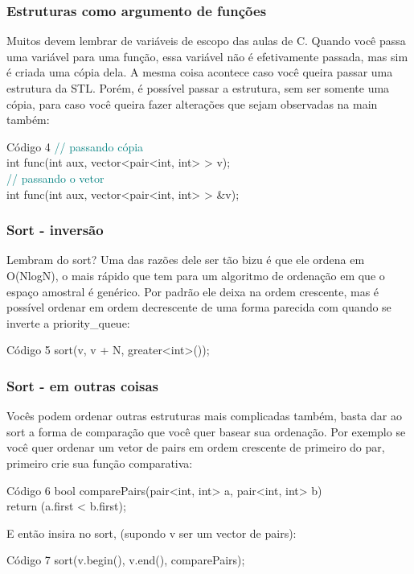 \documentclass{beamer}
\begin{document}
	\begin{frame}
	\frametitle{Estruturas como argumento de funções}
		Muitos devem lembrar de variáveis de escopo das aulas de
		C. Quando você passa uma variável para uma função, essa
		variável não é efetivamente passada, mas sim é criada uma
		cópia dela. A mesma coisa acontece caso você queira passar
		uma estrutura da STL. Porém, é possível passar a estrutura,
		sem ser somente uma cópia, para caso você queira fazer
		alterações que sejam observadas na main também:
		\begin{block}{Código 4}
		\hspace{10 pt} \textcolor{teal}{// passando c\'opia}\\
		\hspace{10 pt} int func(int aux, vector<pair<int, int> > v);\\
		\hspace{10 pt} \textcolor{teal}{// passando o vetor}\\
		\hspace{10 pt} int func(int aux, vector<pair<int, int> > \&v);
		\end{block}
	\end{frame}

	\begin{frame}
	\frametitle{Sort - inversão}
		Lembram do sort? Uma das razões dele ser tão bizu é que
		ele ordena em O(NlogN), o mais rápido que tem para um
		algoritmo de ordenação em que o espaço amostral é genérico.
		Por padrão ele deixa na ordem crescente, mas é possível ordenar
		em ordem decrescente de uma forma parecida com quando se
		inverte a priority\_queue:
		\begin{block}{Código 5}
		\hspace{10 pt} sort(v, v + N, greater<int>());
		\end{block}
	\end{frame}

	\begin{frame}
	\frametitle{Sort - em outras coisas}
		Vocês podem ordenar outras estruturas mais complicadas
		também, basta dar ao sort a forma de comparação que você
		quer basear sua ordenação. Por exemplo se você quer ordenar
		um vetor de pairs em ordem crescente de primeiro do par,
		primeiro crie sua função comparativa:
		\begin{block}{Código 6}
		\hspace{10 pt} bool comparePairs(pair<int, int> a, pair<int, int> b)\\
		\hspace{20 pt} return (a.first < b.first);
		\end{block}
		E então insira no sort, (supondo v ser um vector de pairs):
		\begin{block}{Código 7}
		\hspace{10 pt} sort(v.begin(), v.end(), comparePairs);
		\end{block}
	\end{frame}
\end{document}
